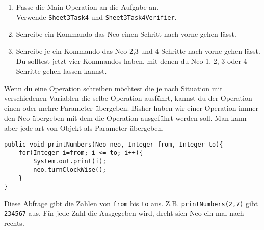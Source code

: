 
\begin{enumerate}
	\item 
		Passe die Main Operation an die Aufgabe an.\\
		Verwende \lstinline{Sheet3Task4} und \lstinline{Sheet3Task4Verifier}.
	\item 
		Schreibe ein Kommando das Neo einen Schritt nach vorne gehen lässt.
	\item 
		Schreibe je ein Kommando das Neo 2,3 und 4 Schritte nach vorne gehen lässt.
		Du solltest jetzt vier Kommandos haben, mit denen du Neo 1, 2, 3 oder 4 Schritte gehen lassen kannst.
\end{enumerate}

\begin{Infobox}
	Wenn du eine Operation schreiben möchtest die je nach Situation mit verschiedenen Variablen die selbe Operation ausführt, kannst du der Operation einen oder mehre Parameter übergeben. 
	Bisher haben wir einer Operation immer den Neo übergeben mit dem die Operation ausgeführt werden soll.
	Man kann aber jede art von Objekt als Parameter übergeben.
	
	\begin{lstlisting}[xleftmargin=0.5cm]
public void printNumbers(Neo neo, Integer from, Integer to){
    for(Integer i=from; i <= to; i++){
		System.out.print(i);
		neo.turnClockWise();
    }
}
	\end{lstlisting}

	Diese Abfrage gibt die Zahlen von \lstinline{from} bis \lstinline{to} aus. 
	Z.B. \lstinline{printNumbers(2,7)} gibt \lstinline{234567} aus.
	Für jede Zahl die Ausgegeben wird, dreht sich Neo ein mal nach rechts.
\end {Infobox}


